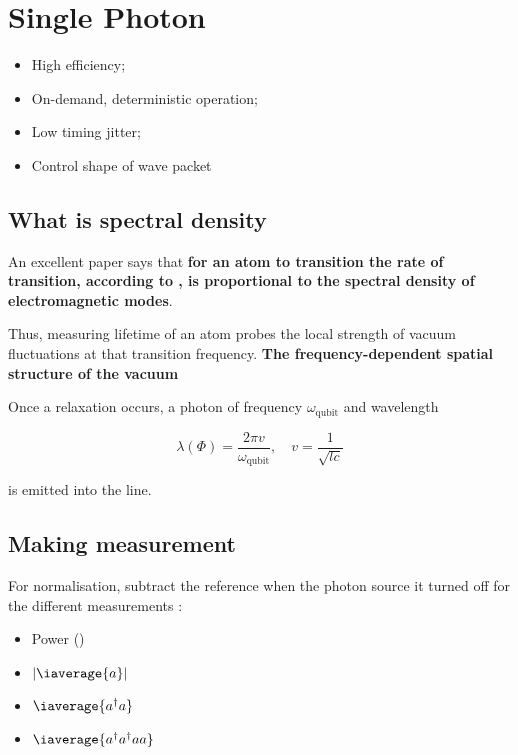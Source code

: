 \newpage
\section{Single Photon}
\label{sec:single-photon}

\begin{itemize}
\item High efficiency;
\item On-demand, deterministic operation;
\item Low timing jitter;
\item Control shape of wave packet \cite{Forn_D_az_2017}
\end{itemize}

\subsection{What is spectral density}
\label{sec:what-spectr-dens}

An excellent  paper \cite{Hoi_2015} says  that \textbf{for an atom  to transition
   \ira {} the rate of transition, according to , is proportional to the spectral density of electromagnetic modes}.

\begin{framed}\noindent
  Thus,  measuring lifetime  of  an  atom probes  the  local  strength of  vacuum
  fluctuations  at that  transition  frequency.  \textbf{The  frequency-dependent
    spatial structure of the vacuum}
\end{framed}

Once a relaxation occurs, a photon of frequency $\omega_{\text{qubit}}$ and wavelength

\begin{equation}
  \lambda(\Phi) = \frac{2\pi v}{\omega_{\text{qubit}}}, \quad v = \frac{1}{\sqrt{lc}}
\end{equation}

\noindent is emitted into the line.

\subsection{Making measurement}
\label{sec:making-measurement}

For normalisation,  subtract the reference when  the photon source it  turned off
for the different measurements \cite{Pechal_2016}:
\begin{itemize}
\item Power ()
\item $\left|\iaverage{a}\right|$
\item $\iaverage{a^{\dagger}a}$
\item $\iaverage{a^{\dagger}a^{\dagger}aa}$
\end{itemize}

